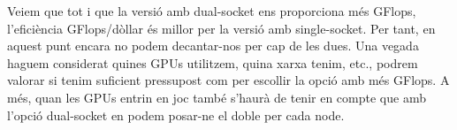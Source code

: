 \begin{table}[h]
\begin{adjustwidth}{-.5in}{-.5in}  
    \begin{center}
    \centering
    \caption{Comparació entre les diferents configuracions dels nodes.}
    \label{tab:web_plaques_cmp}
    \end{center}
    \end{adjustwidth}
\end{table}

Veiem que tot i que la versió amb dual-socket ens proporciona més GFlops, l'eficiència GFlops/dòllar és millor per la versió amb single-socket. Per tant, en aquest punt encara no podem decantar-nos per cap de les dues. Una vegada haguem considerat quines GPUs utilitzem, quina xarxa tenim, etc., podrem valorar si tenim suficient pressupost com per escollir la opció amb més GFlops. A més, quan les GPUs entrin en joc també s'haurà de tenir en compte que amb l'opció dual-socket en podem posar-ne el doble per cada node.

